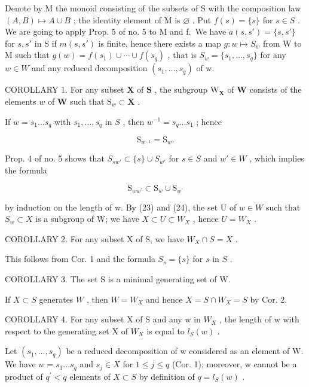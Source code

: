 Denote by M the monoid consisting of the subsets of S with the composition law \((A,B)\mapsto A\cup B\) ; the identity element of M is \(\varnothing\) . Put \(f(s)=\{s\}\) for \(s\in S\) . We are going to apply Prop. 5 of no. 5 to M and f.~We have \(a(s,s')=\{s,s'\}\) for \(s,s'\) in S if \(m(s,s')\) is finite, hence there exists a map \(g:w\mapsto S_w\) from W to M such that \(g(w)=f(s_1)\cup\cdots\cup f(s_q)\) , that is \(S_w=\{s_1,\ldots,s_q\}\) for any \(w\in W\) and any reduced decomposition \((s_1,\ldots,s_q)\) of w.

COROLLARY 1. For any subset \(\mathbf{X}\) of \(\mathbf{S}\) , the subgroup \(\mathrm{W}_{\mathbf{X}}\) of \(\mathbf{W}\) consists of the elements \(w\) of \(\mathbf{W}\) such that \(\mathrm{S}_w \subset \mathbf{X}\) .

If \(w = s_1 \ldots s_q\) with \(s_1, \ldots, s_q\) in \(S\) , then \(w^{-1} = s_q \ldots s_1\) ; hence

\[
\mathrm{S} _ {w ^ {- 1}} = \mathrm{S} _ {w}.\tag{23}
\]

Prop. 4 of no. 5 shows that \(S_{sw'} \subset \{s\} \cup S_{w'}\) for \(s \in S\) and \(w' \in W\) , which implies the formula

\[
\mathrm{S} _ {w w ^ {\prime}} \subset \mathrm{S} _ {w} \cup \mathrm{S} _ {w ^ {\prime}}\tag{24}
\]

by induction on the length of w. By (23) and (24), the set U of \(w \in W\) such that \(S_{w} \subset X\) is a subgroup of W; we have \(X \subset U \subset W_{X}\) , hence \(U = W_{X}\) .

COROLLARY 2. For any subset X of S, we have \(W_{X} \cap S = X\) .

This follows from Cor. 1 and the formula \(S_s = \{s\}\) for \(s\) in \(S\) .

COROLLARY 3. The set S is a minimal generating set of W.

If \(X \subset S\) generates \(W\) , then \(W = W_X\) and hence \(X = S \cap W_X = S\) by Cor. 2.

COROLLARY 4. For any subset X of S and any w in \(W_{X}\) , the length of w with respect to the generating set X of \(W_{X}\) is equal to \(l_{S}(w)\) .

Let \((s_{1},\ldots,s_{q})\) be a reduced decomposition of w considered as an element of W. We have \(w=s_{1}\ldots s_{q}\) and \(s_{j}\in X\) for \(1\leqslant j\leqslant q\) (Cor. 1); moreover, w cannot be a product of \(q^{\prime}<q\) elements of \(X\subset S\) by definition of \(q=l_{S}(w)\) .

